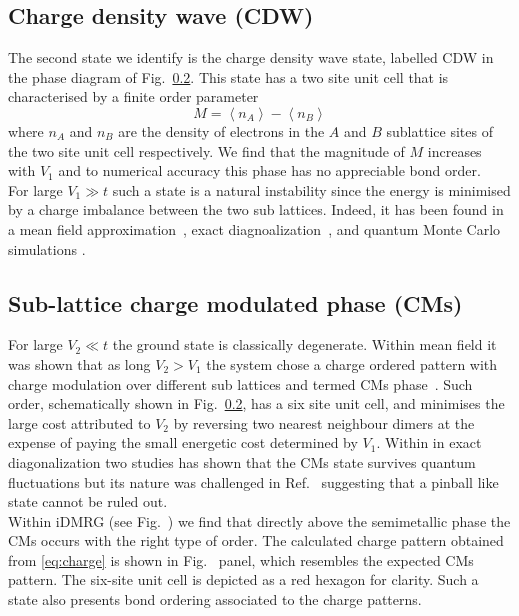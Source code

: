 \documentclass[aps,prx,10pt,twocolumn,floatfix,superscriptaddress,showpacs,numerical,footinbib]{revtex4-1}
\begin{document}
\subsection{Charge density wave (CDW)}
%
The second state we identify is the charge density wave state, labelled CDW in the phase diagram of Fig.~\ref{}.
%
This state has a two site unit cell that is characterised by a finite order parameter
%
\begin{equation}
\label{eq:CDW}
%
M=\left\langle n_{A} \right\rangle-\left\langle n_{B}\right\rangle
%
\end{equation}
%
where $n_{A}$ and $n_{B}$ are the density of electrons in the $A$ and $B$ sublattice sites of the two site unit cell respectively.
%
We find that the magnitude of $M$ increases with $V_{1}$ and to numerical accuracy this phase has no appreciable bond order.\\
%

For large $V_{1}\gg t$ such a state is a natural instability since the energy is minimised by a charge imbalance between the two sub lattices.
%
Indeed, it has been found in a mean field approximation~\cite{Raghu,Franz,us}, exact diagnoalization~\cite{us,daghofer,herbut}, and quantum Monte Carlo simulations
\cite{QMC}.
%


\subsection{Sub-lattice charge modulated phase (CMs)}
%
For large $V_{2}\ll t$ the ground state is classically degenerate. 
%
Within mean field it was shown that as long $V_{2}>V_{1}$
the system chose a charge ordered pattern with charge modulation over different sub lattices and termed CMs phase~\cite{CMs}.
%
Such order, schematically shown in Fig.~\ref{}, has a six site unit cell, and minimises the large cost
attributed to $V_{2}$ by reversing two nearest neighbour dimers at the expense of paying the small energetic cost
determined by $V_{1}$.
%
Within in exact diagonalization two studies has shown that the CMs state survives quantum fluctuations 
but its nature was challenged in Ref.~ suggesting that a pinball like state cannot be ruled out.\\

Within iDMRG (see Fig.~\cite{s}) we find that directly above the semimetallic phase the CMs occurs with the right type of order.
%
The calculated charge pattern obtained from \eqref{eq:charge} is shown in Fig.~\cite{} panel, which resembles the expected
CMs pattern.
%
The six-site unit cell is depicted as a red hexagon for clarity. 
%
Such a state also presents bond ordering associated to the charge patterns.
\end{document}
